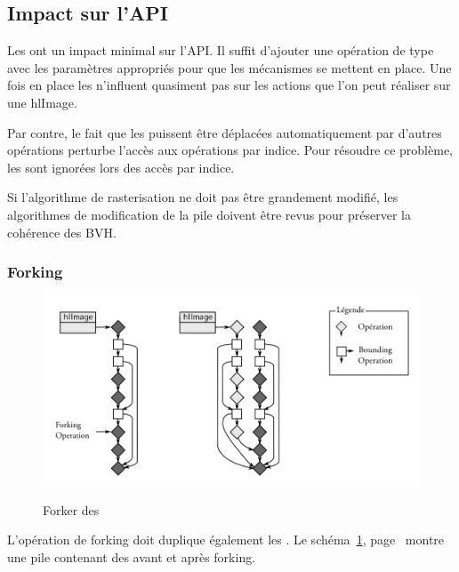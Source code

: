 		\subsection{Impact sur l'API}
			Les \BO ont un impact minimal sur l'API. Il suffit d'ajouter une opération de type \BO avec les paramètres
			appropriés pour que les mécanismes se mettent en place. Une fois en place les \BO n'influent quasiment pas
			sur les actions que l'on peut réaliser sur une hlImage. 

			Par contre, le fait que les \BO puissent être déplacées automatiquement par d'autres opérations perturbe
			l'accès aux opérations par indice. Pour résoudre ce problème, les \BO sont ignorées lors des accès par
			indice. 

			Si l'algorithme de rasterisation ne doit pas être grandement modifié, les algorithmes de modification
			de la pile doivent être revus pour préserver la cohérence des BVH.

			\subsubsection{Forking}
			\begin{figure}[ht]
				\centering
				\includegraphics[width=\textwidth]{images/bo-forking} 
				\label{fig:bo-forking}
				\caption{Forker des \BO}
			\end{figure}
			L'opération de forking doit duplique également les \BO. Le schéma~\ref{fig:bo-forking}, page~\pageref{fig:bo-forking} montre une pile
			contenant des \BO avant et après forking. 

